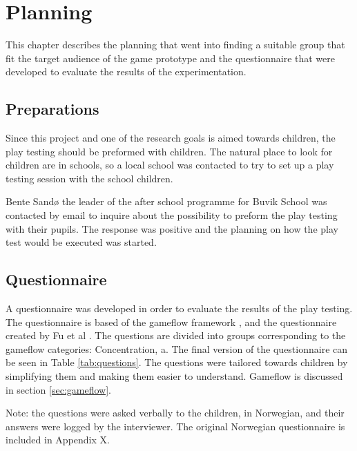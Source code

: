 \chapter{Planning}
This chapter describes the planning that went into finding a suitable group that fit the target audience of the game prototype and the questionnaire that were developed to evaluate the results of the experimentation.


\section{Preparations}
Since this project and one of the research goals is aimed towards children, the play testing should be preformed with children. The natural place to look for children are in schools, so a local school was contacted to try to set up a play testing session with the school children.

Bente Sandø the leader of the after school programme for Buvik School was contacted by email to inquire about the possibility to preform the play testing with their pupils. The response was positive and the planning on how the play test would be executed was started.


\section{Questionnaire}
A questionnaire was developed in order to evaluate the results of the play testing. The questionnaire is based of the gameflow framework \cite{sweetser2005gameflow}, and the questionnaire created by Fu et al \cite{fu2009egameflow}. The questions are divided into groups corresponding to the gameflow categories: Concentration, a. The final version of the questionnaire can be seen in Table \ref{tab:questions}. The questions were tailored towards children by simplifying them and making them easier to understand. Gameflow is discussed in section \ref{sec:gameflow}.

Note: the questions were asked verbally to the children, in Norwegian, and their answers were logged by the interviewer. The original Norwegian questionnaire is included in Appendix X.

